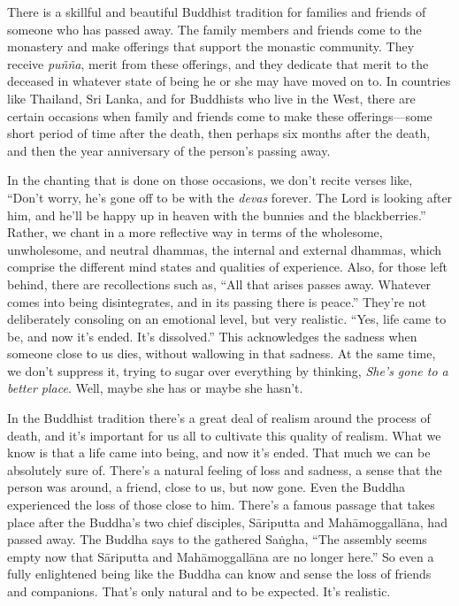 
There is a skillful and beautiful Buddhist tradition for families and 
friends of someone who has passed away. The family members and friends 
come to the monastery and make offerings that support the monastic 
community. They receive \emph{puñña}, merit from these offerings, and 
they dedicate that merit to the deceased in whatever state of being he 
or she may have moved on to. In countries like Thailand, Sri Lanka, and 
for Buddhists who live in the West, there are certain occasions when 
family and friends come to make these offerings---some short period of 
time after the death, then perhaps six months after the death, and then 
the year anniversary of the person's passing away.

In the chanting that is done on those occasions, we don't recite verses 
like, ``Don't worry, he's gone off to be with the \emph{devas} forever. 
The Lord is looking after him, and he'll be happy up in heaven with the 
bunnies and the blackberries.'' Rather, we chant in a more reflective 
way in terms of the wholesome, unwholesome, and neutral dhammas, the 
internal and external dhammas, which comprise the different mind states 
and qualities of experience. Also, for those left behind, there are 
recollections such as, ``All that arises passes away. Whatever comes 
into being disintegrates, and in its passing there is peace.'' They're 
not deliberately consoling on an emotional level, but very realistic. 
``Yes, life came to be, and now it's ended. It's dissolved.'' This 
acknowledges the sadness when someone close to us dies, without 
wallowing in that sadness. At the same time, we don't suppress it, 
trying to sugar over everything by thinking, \emph{She's gone to a 
better place}. Well, maybe she has or maybe she hasn't.

In the Buddhist tradition there's a great deal of realism around the 
process of death, and it's important for us all to cultivate this 
quality of realism. What we know is that a life came into being, and 
now it's ended. That much we can be absolutely sure of. There's a 
natural feeling of loss and sadness, a sense that the person was 
around, a friend, close to us, but now gone. Even the Buddha 
experienced the loss of those close to him. There's a famous passage 
that takes place after the Buddha's two chief disciples, Sāriputta and 
Mahāmoggallāna, had passed away. The Buddha says to the gathered 
Saṅgha, ``The assembly seems empty now that Sāriputta and 
Mahāmoggallāna are no longer here.'' So even a fully enlightened 
being like the Buddha can know and sense the loss of friends and 
companions. That's only natural and to be expected. It's realistic.

